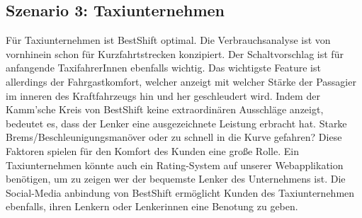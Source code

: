 \subsection{Szenario 3: Taxiunternehmen}
Für Taxiunternehmen ist BestShift optimal. Die Verbrauchsanalyse ist von vornhinein schon für Kurzfahrtstrecken
konzipiert. Der Schaltvorschlag ist für anfangende TaxifahrerInnen ebenfalls wichtig.
Das wichtigste Feature ist allerdings der Fahrgastkomfort, welcher anzeigt mit welcher Stärke der Passagier
im inneren des Kraftfahrzeugs hin und her geschleudert wird. Indem der Kamm'sche Kreis von BestShift keine 
extraordinären Ausschläge anzeigt, bedeutet es, dass der Lenker eine ausgezeichnete Leistung erbracht hat.
Starke Brems/Beschleunigungsmanöver oder zu schnell in die Kurve gefahren? Diese Faktoren spielen
für den Komfort des Kunden eine große Rolle. Ein Taxiunternehmen könnte auch ein Rating-System auf unserer
Webapplikation benötigen, um zu zeigen wer der bequemste Lenker des Unternehmens ist.
Die Social-Media anbindung von BestShift ermöglicht Kunden des Taxiunternehmen ebenfalls, ihren Lenkern oder
Lenkerinnen eine Benotung zu geben. 
